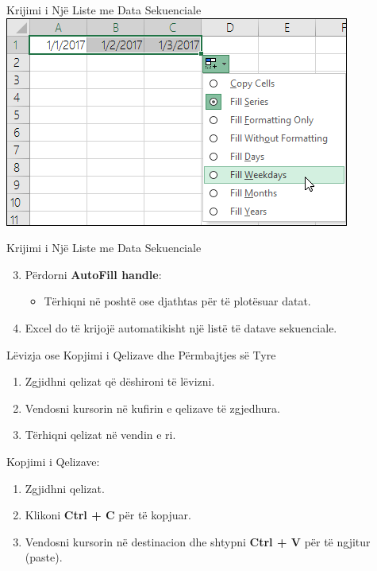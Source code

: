 \documentclass[
  ignorenonframetext,
]{beamer}
\providecommand{\tightlist}{%
  \setlength{\itemsep}{0pt}\setlength{\parskip}{0pt}}
\begin{document}
\begin{frame}{Krijimi i Një Liste me Data Sekuenciale}
\label{krijimi-i-njuxeb-liste-me-data-sekuenciale-1}
\includegraphics{./images/excel9.png}
\end{frame}

\begin{frame}{Krijimi i Një Liste me Data Sekuenciale}
\label{krijimi-i-njuxeb-liste-me-data-sekuenciale-2}
\begin{enumerate}
\setcounter{enumi}{2}
\item
  Përdorni \textbf{AutoFill handle}:

  \begin{itemize}
  \tightlist
  \item
    Tërhiqni në poshtë ose djathtas për të plotësuar datat.
  \end{itemize}
\item
  Excel do të krijojë automatikisht një listë të datave sekuenciale.
\end{enumerate}
\end{frame}

\begin{frame}{Lëvizja ose Kopjimi i Qelizave dhe Përmbajtjes së Tyre}
\label{luxebvizja-ose-kopjimi-i-qelizave-dhe-puxebrmbajtjes-suxeb-tyre}
\begin{enumerate}
\item
  Zgjidhni qelizat që dëshironi të lëvizni.
\item
  Vendosni kursorin në kufirin e qelizave të zgjedhura.
\item
  Tërhiqni qelizat në vendin e ri.
\end{enumerate}
\end{frame}

\begin{frame}{Kopjimi i Qelizave:}
\label{kopjimi-i-qelizave}
\begin{enumerate}
\item
  Zgjidhni qelizat.
\item
  Klikoni \textbf{Ctrl + C} për të kopjuar.
\item
  Vendosni kursorin në destinacion dhe shtypni \textbf{Ctrl + V} për të
  ngjitur (paste).
\end{enumerate}
\end{frame}
\end{document}
